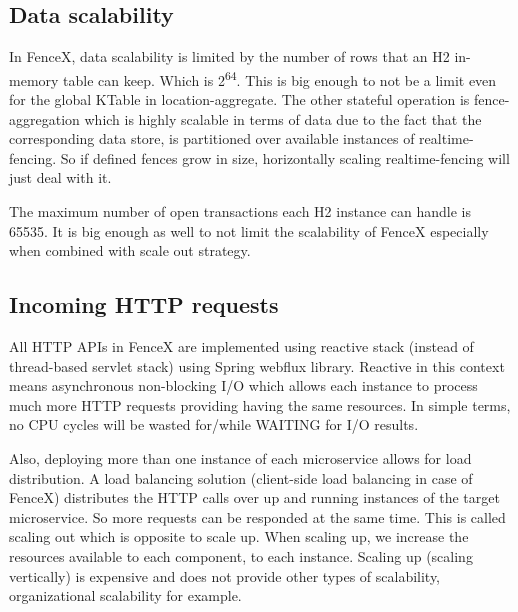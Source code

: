 \documentclass[a4]{report}
\begin{document}
    \subsection{Data scalability}
    In FenceX, data scalability is limited by the number of rows that an H2 in-memory table can keep.
    Which is 2\textsuperscript{64}.
    This is big enough to not be a limit even for the global KTable in location-aggregate.
    The other stateful operation is fence-aggregation which is highly scalable in terms of data due to the fact that the corresponding data store, is partitioned over available instances of realtime-fencing.
    So if defined fences grow in size, horizontally scaling realtime-fencing will just deal with it.

    The maximum number of open transactions each H2 instance can handle is 65535.
    It is big enough as well to not limit the scalability of FenceX especially when combined with scale out strategy.

    \subsection{Incoming HTTP requests}
    All HTTP APIs in FenceX are implemented using reactive stack (instead of thread-based servlet stack) using Spring
    webflux library.
    Reactive in this context means asynchronous non-blocking I/O which allows each instance to process much more HTTP
    requests providing having the same resources.
    In simple terms, no CPU cycles will be wasted for/while WAITING for I/O results.

    Also, deploying more than one instance of each microservice allows for load distribution.
    A load balancing solution (client-side load balancing in case of FenceX) distributes the HTTP calls over up and running instances of the target microservice.
    So more requests can be responded at the same time.
    This is called scaling out which is opposite to scale up.
    When scaling up, we increase the resources available to each component, to each instance.
    Scaling up (scaling vertically) is expensive and does not provide other types of scalability, organizational scalability for example.
\end{document}
